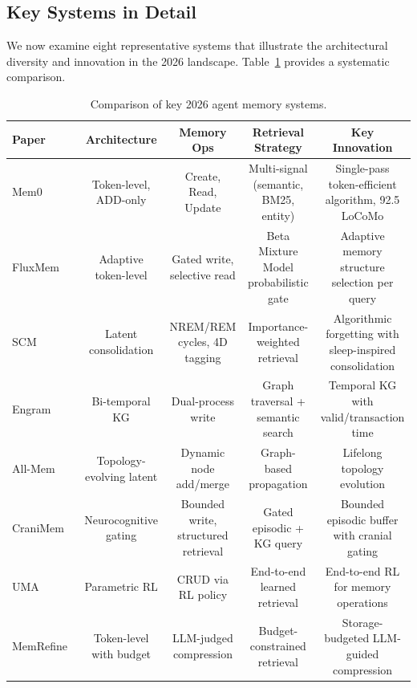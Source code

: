 \subsection{Key Systems in Detail}

We now examine eight representative systems that illustrate the architectural diversity and innovation in the 2026 landscape. Table~\ref{tab:landscape_comparison} provides a systematic comparison.

\begin{table}[t]
\centering
\caption{Comparison of key 2026 agent memory systems.}
\label{tab:landscape_comparison}
\small
\begin{tabular}{lcccc}
\toprule
\textbf{Paper} & \textbf{Architecture} & \textbf{Memory Ops} & \textbf{Retrieval Strategy} & \textbf{Key Innovation} \\
\midrule
Mem0~\cite{Unknown2025Mem0} & Token-level, ADD-only & Create, Read, Update & Multi-signal (semantic, BM25, entity) & Single-pass token-efficient algorithm, 92.5 LoCoMo \\
FluxMem~\cite{Unknown2026FluxMem} & Adaptive token-level & Gated write, selective read & Beta Mixture Model probabilistic gate & Adaptive memory structure selection per query \\
SCM~\cite{Unknown2026SCM} & Latent consolidation & NREM/REM cycles, 4D tagging & Importance-weighted retrieval & Algorithmic forgetting with sleep-inspired consolidation \\
Engram~\cite{Unknown2026Engram} & Bi-temporal KG & Dual-process write & Graph traversal + semantic search & Temporal KG with valid/transaction time \\
All-Mem~\cite{Unknown2026AllMem} & Topology-evolving latent & Dynamic node add/merge & Graph-based propagation & Lifelong topology evolution \\
CraniMem~\cite{Unknown2026CraniMem} & Neurocognitive gating & Bounded write, structured retrieval & Gated episodic + KG query & Bounded episodic buffer with cranial gating \\
UMA~\cite{Unknown2026LearningtoRemember} & Parametric RL & CRUD via RL policy & End-to-end learned retrieval & End-to-end RL for memory operations \\
MemRefine~\cite{Kim2026MemRefine} & Token-level with budget & LLM-judged compression & Budget-constrained retrieval & Storage-budgeted LLM-guided compression \\
\bottomrule
\end{tabular}
\end{table}

